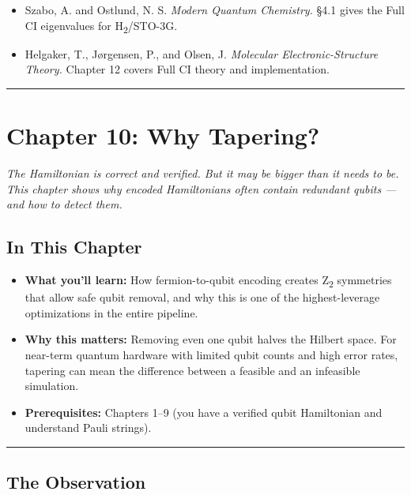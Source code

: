 \documentclass[
  11pt,
  oneside]{book}
\providecommand{\tightlist}{%
  \setlength{\itemsep}{0pt}\setlength{\parskip}{0pt}}
\begin{document}
\begin{itemize}
\tightlist
\item
  Szabo, A. and Ostlund, N. S. \emph{Modern Quantum Chemistry.} §4.1
  gives the Full CI eigenvalues for H\textsubscript{2}/STO-3G.
\item
  Helgaker, T., Jørgensen, P., and Olsen, J. \emph{Molecular
  Electronic-Structure Theory.} Chapter 12 covers Full CI theory and
  implementation.
\end{itemize}

\begin{center}\rule{0.5\linewidth}{0.5pt}\end{center}

\chapter{Chapter 10: Why Tapering?}\label{chapter-10-why-tapering}

\emph{The Hamiltonian is correct and verified. But it may be bigger than
it needs to be. This chapter shows why encoded Hamiltonians often
contain redundant qubits --- and how to detect them.}

\section{In This Chapter}\label{in-this-chapter-9}

\begin{itemize}
\tightlist
\item
  \textbf{What you'll learn:} How fermion-to-qubit encoding creates Z\textsubscript{2}
  symmetries that allow safe qubit removal, and why this is one of the
  highest-leverage optimizations in the entire pipeline.
\item
  \textbf{Why this matters:} Removing even one qubit halves the Hilbert
  space. For near-term quantum hardware with limited qubit counts and
  high error rates, tapering can mean the difference between a feasible
  and an infeasible simulation.
\item
  \textbf{Prerequisites:} Chapters 1--9 (you have a verified qubit
  Hamiltonian and understand Pauli strings).
\end{itemize}

\begin{center}\rule{0.5\linewidth}{0.5pt}\end{center}

\section{The Observation}\label{the-observation}
\end{document}
